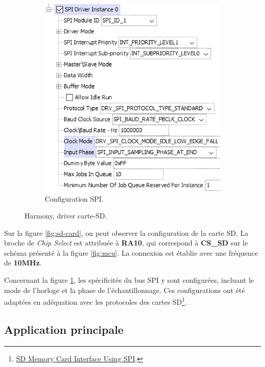 \begin{figure}[!h]
\begin{subfigure}[b]{0.44\textwidth}
		\includegraphics[width=\linewidth]{../figures/code/harmony/SD-card-spi}
		\caption{Configuration SPI.}
		\label{fig:sd-card-spi}
	\end{subfigure}
	\hfill
	\caption{Harmony, driver carte-SD.}
	\label{fig:HDriverSD}
\end{figure}

Sur la figure \ref{fig:sd-card}, on peut observer la configuration de la carte SD. La broche de \textit{Chip Select} est attribuée à \textbf{RA10}, qui correspond à \textbf{CS\_SD} sur le schéma présenté à la figure \ref{fig:mcu}. La connexion est établie avec une fréquence de \textbf{10MHz}.

Concernant la figure \ref{fig:sd-card-spi}, les spécificités du bus SPI y sont configurées, incluant le mode de l'horloge et la phase de l'échantillonnage. Ces configurations ont été adaptées en adéquation avec les protocoles des cartes SD\footnote{\href{https://www.renesas.com/us/en/document/apn/sd-memory-card-interface-using-spi}{SD Memory Card Interface Using SPI}.}.


\clearpage

\subsection{Application principale} 

